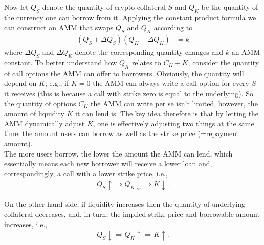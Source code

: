 \documentclass[a4paper]{article}
\begin{document}

Now let $Q_S$ denote the quantity of crypto collateral $S$ and $Q_K$ be the quantity of the currency one can borrow from it. Applying the constant product formula we can construct an AMM that swaps $Q_S$ and $Q_K$ according to
\begin{equation}
\begin{split}
(Q_S+\Delta Q_S)(Q_K-\Delta Q_K) &= k
\end{split}
\end{equation}
where $\Delta Q_S$ and $\Delta Q_K$ denote the corresponding quantity changes and $k$ an AMM constant. To better understand how $Q_K$ relates to $C_K+K$, consider the quantity of call options the AMM can offer to borrowers. Obviously, the quantity will depend on $K$, e.g., if $K=0$ the AMM can always write a call option for every $S$ it receives (this is because a call with strike zero is equal to the underlying). So the quantity of options $C_K$ the AMM can write per se isn't limited, however, the amount of liquidity $K$ it can lend is. The key idea therefore is that by letting the AMM dynamically adjust $K$, one is effectively adjusting two things at the same time: the amount users can borrow as well as the strike price (=repayment amount).\\

The more users borrow, the lower the amount the AMM can lend, which essentially means each new borrower will receive a lower loan and, correspondingly, a call with a lower strike price, i.e.,
\begin{equation}
\label{eq:more_borrowing_strike}
\begin{split}
Q_S\uparrow \Rightarrow Q_K\downarrow \Rightarrow K\downarrow.
\end{split}
\end{equation}

On the other hand side, if liquidity increases then the quantity of underlying collateral decreases, and, in turn, the implied strike price and borrowable amount increases, i.e.,
\begin{equation}
\label{eq:more_lending_strike}
\begin{split}
Q_S\downarrow \Rightarrow Q_K\uparrow \Rightarrow K\uparrow.
\end{split}
\end{equation}
\end{document}
